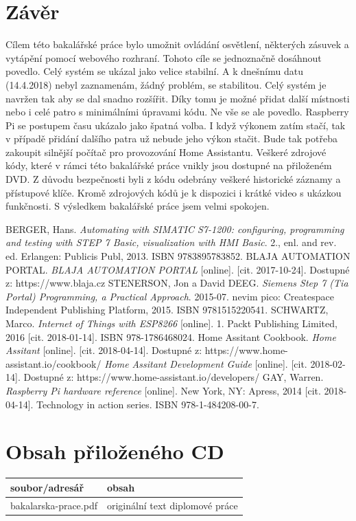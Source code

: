 \documentclass[a4paper,12pt,czech,bibliography=totoc]{scrbook}
\begin{document}
 
\chapter{Závěr}
Cílem této bakalářské práce bylo umožnit ovládání osvětlení, některých zásuvek a vytápění pomocí webového rozhraní. Tohoto cíle se jednoznačně dosáhnout povedlo. Celý systém se ukázal jako velice stabilní. A k dnešnímu datu (14.4.2018) nebyl zaznamenám, žádný problém, se stabilitou. Celý systém je navržen tak aby se dal snadno rozšířit. Díky tomu je možné přidat další místnosti nebo i celé patro s minimálními úpravami kódu. Ne vše se ale povedlo. Raspberry Pi se postupem času ukázalo jako špatná volba. I když výkonem zatím stačí, tak v případě přidání dalšího patra už nebude jeho výkon stačit. Bude tak potřeba zakoupit silnější počítač pro provozování Home Assistantu.
\newline
\newline
Veškeré zdrojové kódy, které v rámci této bakalářské práce vnikly jsou dostupné na přiloženém DVD. Z důvodu bezpečnosti byli z kódu odebrány veškeré historické záznamy a přístupové klíče. Kromě zdrojových kódů je k dispozici i krátké video s ukázkou funkčnosti.
\newline
\newline
S výsledkem bakalářské práce jsem velmi spokojen.


\begin{thebibliography}{99}	
BERGER, Hans. \textit{Automating with SIMATIC S7-1200: configuring, programming and testing with STEP 7 Basic, visualization with HMI Basic}. 2., enl. and rev. ed. Erlangen: Publicis Publ, 2013. ISBN 9783895783852.
BLAJA AUTOMATION PORTAL. \textit{BLAJA AUTOMATION PORTAL} [online]. [cit. 2017-10-24]. Dostupné z: https://www.blaja.cz
STENERSON, Jon a David DEEG. \textit{Siemens Step 7 (Tia Portal) Programming, a Practical Approach}. 2015-07. nevim pico: Createspace Independent Publishing Platform, 2015. ISBN 9781515220541.
SCHWARTZ, Marco. \textit{Internet of Things with ESP8266} [online]. 1. Packt Publishing Limited, 2016 [cit. 2018-01-14]. ISBN 978-1786468024.
Home Assitant Cookbook. \textit{Home Assitant} [online]. [cit. 2018-04-14]. Dostupné z: https://www.home-assistant.io/cookbook/
\textit{Home Assitant Development Guide} [online]. [cit. 2018-02-14]. Dostupné z: https://www.home-assistant.io/developers/
GAY, Warren. \textit{Raspberry Pi hardware reference} [online]. New York, NY: Apress, 2014 [cit. 2018-04-14]. Technology in action series. ISBN 978-1-484208-00-7.
\end{thebibliography}

\listoffigures



\appendix


\chapter{Obsah přiloženého CD}

\begin{tabular}{lp{8cm}}
  \hline
  soubor/adresář     &  obsah  \\
  \hline
  bakalarska-prace.pdf   &   originální text diplomové práce \\
\end{tabular}
\end{document}
